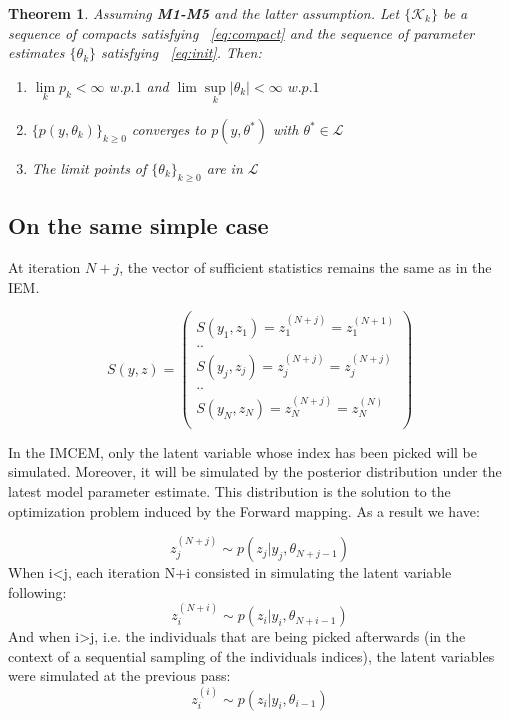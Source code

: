\documentclass{article}
\theoremstyle{plain}
\theoremstyle{plain}
\newtheorem{thm}{Theorem}
\theoremstyle{definition}
\begin{document}
\begin{thm}
Assuming {\normalfont \textbf{M1-M5}} and the latter assumption. Let $\{\mathcal{K}_{k}\}$ be a sequence of compacts satisfying ~\ref{eq:compact} and the sequence of parameter estimates $\{\theta_{k}\}$ satisfying ~\ref{eq:init}. Then:
\begin{enumerate}
  \item $\lim\limits_{k} p_{k} < \infty$ $w.p.1$ and $\lim \sup\limits_{k} |\theta_{k}|< \infty $ $w.p.1$
  \item $\{p(y,\theta_{k})\}_{k \geq 0}$ converges to $p(y,\theta^*)$ with $\theta^* \in \mathcal{L}$
  \item The limit points of $\{\theta_{k}\}_{k \geq 0}$ are in $\mathcal{L}$
\end{enumerate}
\end{thm}


\subsection{On the same simple case}
At iteration $N+j$, the vector of sufficient statistics remains the same as in the IEM.

\begin{equation}
S(y,z) = 
\left(
\begin{array}{c}
S(y_1,z_1) =z_1^{(N+j)}= z_1^{(N+1)}\\
..\\
S(y_j,z_j) =z_j^{(N+j)}= z_j^{(N+j)}\\
..\\
S(y_N,z_N) =z_N^{(N+j)}= z_N^{(N)}\\
\end{array}
\right)
\end{equation}

In the IMCEM, only the latent variable whose index has been picked will be simulated. Moreover, it will be simulated by the posterior distribution under the latest model parameter estimate. This distribution is the solution to the optimization problem induced by the Forward mapping. As a result we have:

\begin{equation}
z_j^{(N+j)} \sim p(z_j|y_j,\theta_{N+j-1})
\end{equation}
When i<j, each iteration N+i consisted in simulating the latent variable following:
\begin{equation}
z_i^{(N+i)} \sim p(z_i|y_i,\theta_{N+i-1})
\end{equation}
And when i>j, i.e. the individuals that are being picked afterwards (in the context of a sequential sampling of the individuals indices), the latent variables were simulated at the previous pass:
\begin{equation}
z_i^{(i)} \sim p(z_i|y_i,\theta_{i-1})
\end{equation}
\end{document}
